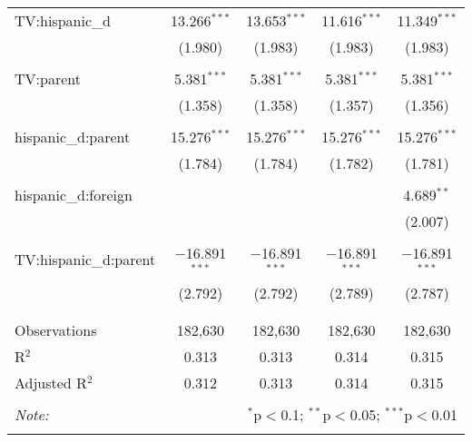 \begin{table}[!htbp]
\begin{tabular}{@{\extracolsep{-5pt}}lcccc}
 TV:hispanic\_d & 13.266$^{***}$ & 13.653$^{***}$ & 11.616$^{***}$ & 11.349$^{***}$ \\ 
  & (1.980) & (1.983) & (1.983) & (1.983) \\ 
  & & & & \\ 
 TV:parent & 5.381$^{***}$ & 5.381$^{***}$ & 5.381$^{***}$ & 5.381$^{***}$ \\ 
  & (1.358) & (1.358) & (1.357) & (1.356) \\ 
  & & & & \\ 
 hispanic\_d:parent & 15.276$^{***}$ & 15.276$^{***}$ & 15.276$^{***}$ & 15.276$^{***}$ \\ 
  & (1.784) & (1.784) & (1.782) & (1.781) \\ 
  & & & & \\ 
 hispanic\_d:foreign &  &  &  & 4.689$^{**}$ \\ 
  &  &  &  & (2.007) \\ 
  & & & & \\ 
 TV:hispanic\_d:parent & $-$16.891$^{***}$ & $-$16.891$^{***}$ & $-$16.891$^{***}$ & $-$16.891$^{***}$ \\ 
  & (2.792) & (2.792) & (2.789) & (2.787) \\ 
  & & & & \\ 
\hline \\[-1.8ex] 
Observations & 182,630 & 182,630 & 182,630 & 182,630 \\ 
R$^{2}$ & 0.313 & 0.313 & 0.314 & 0.315 \\ 
Adjusted R$^{2}$ & 0.312 & 0.313 & 0.314 & 0.315 \\ 
\hline 
\hline \\[-1.8ex] 
\textit{Note:}  & \multicolumn{4}{r}{$^{*}$p$<$0.1; $^{**}$p$<$0.05; $^{***}$p$<$0.01} \\ 
 & \multicolumn{4}{r}{} \\ 
\end{tabular} 
\end{table} 
